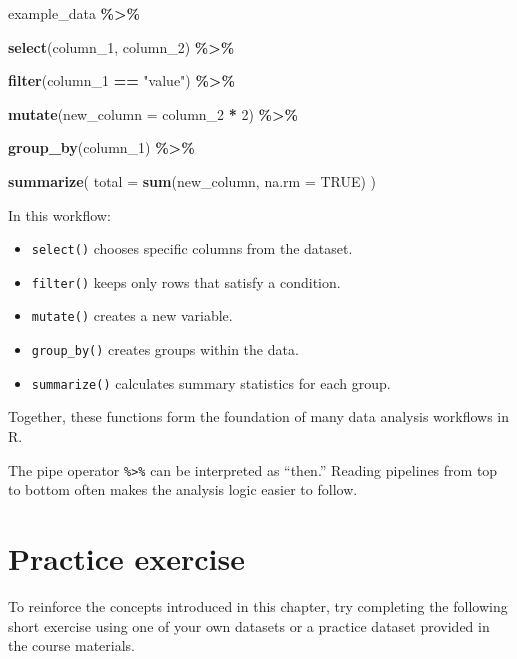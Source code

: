\documentclass[
  11pt,
  oneside]{book}
\newenvironment{Shaded}{\begin{snugshade}}{\end{snugshade}}
\newcommand{\AttributeTok}[1]{\textcolor[rgb]{0.13,0.29,0.53}{#1}}
\newcommand{\ConstantTok}[1]{\textcolor[rgb]{0.56,0.35,0.01}{#1}}
\newcommand{\DecValTok}[1]{\textcolor[rgb]{0.00,0.00,0.81}{#1}}
\newcommand{\FunctionTok}[1]{\textcolor[rgb]{0.13,0.29,0.53}{\textbf{#1}}}
\newcommand{\NormalTok}[1]{#1}
\newcommand{\SpecialCharTok}[1]{\textcolor[rgb]{0.81,0.36,0.00}{\textbf{#1}}}
\newcommand{\StringTok}[1]{\textcolor[rgb]{0.31,0.60,0.02}{#1}}
\providecommand{\tightlist}{%
  \setlength{\itemsep}{0pt}\setlength{\parskip}{0pt}}
\begin{document}
\begin{Shaded}
\begin{Highlighting}[]
\NormalTok{example\_data }\SpecialCharTok{\%\textgreater{}\%}
  
  \FunctionTok{select}\NormalTok{(column\_1, column\_2) }\SpecialCharTok{\%\textgreater{}\%}
  
  \FunctionTok{filter}\NormalTok{(column\_1 }\SpecialCharTok{==} \StringTok{"value"}\NormalTok{) }\SpecialCharTok{\%\textgreater{}\%}
  
  \FunctionTok{mutate}\NormalTok{(}\AttributeTok{new\_column =}\NormalTok{ column\_2 }\SpecialCharTok{*} \DecValTok{2}\NormalTok{) }\SpecialCharTok{\%\textgreater{}\%}
  
  \FunctionTok{group\_by}\NormalTok{(column\_1) }\SpecialCharTok{\%\textgreater{}\%}
  
  \FunctionTok{summarize}\NormalTok{(}
    \AttributeTok{total =} \FunctionTok{sum}\NormalTok{(new\_column, }\AttributeTok{na.rm =} \ConstantTok{TRUE}\NormalTok{)}
\NormalTok{  )}
\end{Highlighting}
\end{Shaded}

In this workflow:

\begin{itemize}
\tightlist
\item
  \texttt{select()} chooses specific columns from the dataset.
\item
  \texttt{filter()} keeps only rows that satisfy a condition.
\item
  \texttt{mutate()} creates a new variable.
\item
  \texttt{group\_by()} creates groups within the data.
\item
  \texttt{summarize()} calculates summary statistics for each group.
\end{itemize}

Together, these functions form the foundation of many data analysis workflows in R.

The pipe operator \texttt{\%\textgreater{}\%} can be interpreted as ``then.'' Reading pipelines from top to bottom often makes the analysis logic easier to follow.

\section{Practice exercise}\label{practice-exercise}

To reinforce the concepts introduced in this chapter, try completing the following short exercise using one of your own datasets or a practice dataset provided in the course materials.
\end{document}
